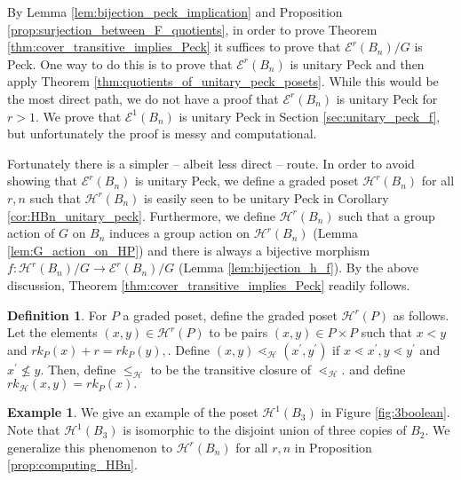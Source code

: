 \documentclass[10 pt]{amsart}
\theoremstyle{plain}
\theoremstyle{definition}
\newtheorem{defn}[thm]{Definition}
\newtheorem{eg}[thm]{Example}
\theoremstyle{remark}
\numberwithin{equation}{section}
\begin{document}
By Lemma \ref{lem:bijection_peck_implication} and Proposition \ref{prop:surjection_between_F_quotients}, in order to prove Theorem \ref{thm:cover_transitive_implies_Peck} it suffices to prove that $\mathcal E^r(B_n)/G$ is Peck.  One way to do this is to prove that $\mathcal E^r(B_n)$ is unitary Peck and then apply Theorem \ref{thm:quotients_of_unitary_peck_posets}.  While this would be the most direct path, we do not have a proof that $\mathcal E^r(B_n)$ is unitary Peck for $r>1$.  We prove that $\mathcal E^1(B_n)$ is unitary Peck in Section \ref{sec:unitary_peck_f}, but unfortunately the proof is messy and computational.



Fortunately there is a simpler -- albeit less direct -- route.  In order to avoid showing that $\mathcal E^r(B_n)$ is unitary Peck, we define a graded poset $\mathcal{H}^r(B_n)$ for all $r,n$ such that $\mathcal{H}^r(B_n)$ is easily seen to be unitary Peck in Corollary \ref{cor:HBn_unitary_peck}. Furthermore, we define $\mathcal{H}^r(B_n)$ such that a group action of $G$ on $B_n$ induces a group action on $\mathcal{H}^r(B_n)$ (Lemma \ref{lem:G_action_on_HP}) and there is always a bijective morphism $f\colon \mathcal{H}^r(B_n)/G\rightarrow \mathcal E^r(B_n)/G$ (Lemma \ref{lem:bijection_h_f}).  By the above discussion, Theorem \ref{thm:cover_transitive_implies_Peck} readily follows.

\begin{defn}
\label{defn:h_map}
For $P$ a graded poset, define the graded poset $\mathcal H^r(P)$ as follows. Let the elements $(x, y) \in \mathcal H^r(P)$ to be pairs $(x,y) \in P\times P$ such that $x <y$ and $rk_P(x) + r = rk_P(y),$.  Define $(x, y) \lessdot_{\mathcal H} (x^\prime, y^\prime)$ if $x \lessdot x^\prime,y\lessdot y^\prime$ and $x^\prime \not \leq y.$ Then, define $\leq_{\mathcal H}$ to be the transitive closure of $\lessdot_{\mathcal H}.$ and define $rk_{\mathcal H}(x, y) = rk_P(x).$
\end{defn}

\begin{eg}
We give an example of the poset $\mathcal H^1(B_3)$ in Figure \ref{fig:3boolean}.  Note that $\mathcal H^1(B_3)$ is isomorphic to the disjoint union of three copies of $B_2$.  We generalize this phenomenon to $\mathcal{H}^r(B_n)$ for all $r,n$ in Proposition \ref{prop:computing_HBn}.
\end{eg}
\end{document}

